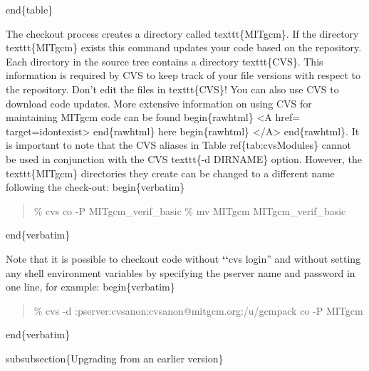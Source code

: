 \documentclass[letterpaper,10pt,english]{sphinxmanual}
\begin{document}
end\{table\}

The checkout process creates a directory called texttt\{MITgcm\}. If
the directory texttt\{MITgcm\} exists this command updates your code
based on the repository. Each directory in the source tree contains a
directory texttt\{CVS\}. This information is required by CVS to keep
track of your file versions with respect to the repository. Don't edit
the files in texttt\{CVS\}!  You can also use CVS to download code
updates.  More extensive information on using CVS for maintaining
MITgcm code can be found
begin\{rawhtml\} \textless{}A href=\sphinxquotedblright{}\sphinxquotedblright{} target=\sphinxquotedblright{}idontexist\sphinxquotedblright{}\textgreater{} end\{rawhtml\}
here
begin\{rawhtml\} \textless{}/A\textgreater{} end\{rawhtml\}.
It is important to note that the CVS aliases in Table
ref\{tab:cvsModules\} cannot be used in conjunction with the CVS
texttt\{-d DIRNAME\} option.  However, the texttt\{MITgcm\} directories
they create can be changed to a different name following the check-out:
begin\{verbatim\}
\begin{quote}

\%  cvs co -P MITgcm\_verif\_basic
\%  mv MITgcm MITgcm\_verif\_basic
\end{quote}

end\{verbatim\}

Note that it is possible to checkout code without {\color{red}\bfseries{}{}`{}`}cvs login'' and without
setting any shell environment variables by specifying the pserver name and
password in one line, for example:
begin\{verbatim\}
\begin{quote}

\%  cvs -d :pserver:cvsanon:cvsanon@mitgcm.org:/u/gcmpack co -P MITgcm
\end{quote}

end\{verbatim\}

subsubsection\{Upgrading from an earlier version\}
\end{document}
